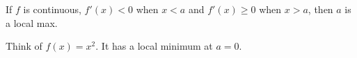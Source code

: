 \documentclass{ximera}
\author{Steven Gubkin}
\begin{document}
\begin{exercise}

	If $f$ is continuous, $f'(x)<0$ when $x<a$ and $f'(x) \geq 0$ when $x>a$, then $a$ is a local max.
	\begin{hint}
 Think of $f(x)=x^2$. It has a local minimum at $a=0$.
 \end{hint}	
	\begin{multipleChoice}	
	\end{multipleChoice}

\end{exercise}
\end{document}
